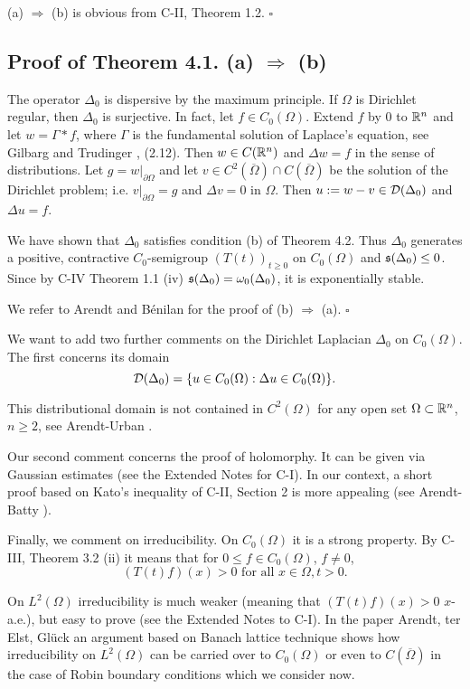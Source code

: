 (a) $\Rightarrow$ (b) is obvious from C-II, Theorem 1.2. $\square$

\subsection{Proof of Theorem 4.1. (a) $\Rightarrow$ (b)}

The operator $\Delta_0$ is dispersive by the maximum principle. If $\Omega$ is Dirichlet regular, then $\Delta_0$ is surjective. In fact, let $f \in C_0(\Omega)$. Extend $f$ by $0$ to $\mathbb{R}^n$ and let $w = \Gamma * f$, where $\Gamma$ is the fundamental solution of Laplace's equation, see Gilbarg and Trudinger \cite{GT83}, (2.12). Then $w \in C(\mathbb{R}^n)$ and $\Delta w = f$ in the sense of distributions. Let $g = w|_{\partial\Omega}$ and let $v \in C^2(\overline{\Omega}) \cap C(\overline{\Omega})$ be the solution of the Dirichlet problem; i.e. $v|_{\partial\Omega} = g$ and $\Delta v = 0$ in $\Omega$. Then $u := w - v \in \mathcal{D}(\Delta_0)$ and $\Delta u = f$.

We have shown that $\Delta_0$ satisfies condition (b) of Theorem 4.2. Thus $\Delta_0$ generates a positive, contractive $C_0$-semigroup $(T(t))_{t \geq 0}$ on $C_0(\Omega)$ and $\mathfrak{s}(\Delta_0) \leq 0$. Since by C-IV Theorem 1.1 (iv) $\mathfrak{s}(\Delta_0) = \omega_0(\Delta_0)$, it is exponentially stable.

We refer to Arendt and Bénilan \cite{ArBe99} for the proof of (b) $\Rightarrow$ (a). $\square$

We want to add two further comments on the Dirichlet Laplacian $\Delta_0$ on $C_0(\Omega)$. The first concerns its domain
\[\mathcal{D}(\Delta_0) = \{u \in C_0(\Omega) : \Delta u \in C_0(\Omega)\}.\]

This distributional domain is not contained in $C^2(\Omega)$ for any open set $\Omega \subset \mathbb{R}^n$, $n \geq 2$, see Arendt-Urban \cite[Theorem 6.60]{Au23}.

Our second comment concerns the proof of holomorphy. It can be given via Gaussian estimates (see the Extended Notes for C-I). In our context, a short proof based on Kato's inequality of C-II, Section 2 is more appealing (see Arendt-Batty \cite{ArBa92}).

Finally, we comment on irreducibility. On $C_0(\Omega)$ it is a strong property. By C-III, Theorem 3.2 (ii) it means that for $0 \leq f \in C_0(\Omega)$, $f \neq 0$,
\[(T(t)f)(x) > 0 \text{ for all } x \in \Omega, t > 0.\]

On $L^2(\Omega)$ irreducibility is much weaker (meaning that $(T(t)f)(x) > 0$ $x$-a.e.), but easy to prove (see the Extended Notes to C-I). In the paper Arendt, ter Elst, Glück \cite{AEG20} an argument based on Banach lattice technique shows how irreducibility on $L^2(\Omega)$ can be carried over to $C_0(\Omega)$ or even to $C(\overline{\Omega})$ in the case of Robin boundary conditions which we consider now.

